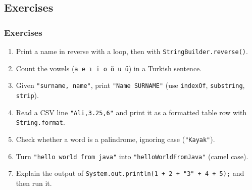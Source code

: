 \documentclass[aspectratio=169,10pt,compress]{beamer}
\begin{document}
\subsection[Exercises]{Exercises}




\begin{frame}[t,fragile] \frametitle{Exercises}
  \begin{enumerate}\small
    \item Print a name in reverse with a loop, then with \texttt{StringBuilder.reverse()}.
    \item Count the vowels (\texttt{a e ı i o ö u ü}) in a Turkish sentence.
    \item Given \texttt{"surname, name"}, print \texttt{"Name SURNAME"} (use \texttt{indexOf}, \texttt{substring}, \texttt{strip}).
    \item Read a CSV line \texttt{"Ali,3.25,6"} and print it as a formatted table row with \texttt{String.format}.
    \item Check whether a word is a palindrome, ignoring case (\texttt{"Kayak"}).
    \item Turn \texttt{"hello world from java"} into \texttt{"helloWorldFromJava"} (camel case).
    \item Explain the output of \texttt{System.out.println(1 + 2 + "3" + 4 + 5);} and then run it.
  \end{enumerate}
\end{frame}




\begin{frame}[t,fragile]
	\begin{center}
		\vspace{4cm}
	\end{center}
\end{frame}
\end{document}
